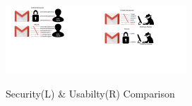 \begin{figure}[htb]
	\begin{center}
		\includegraphics[height=1in,width=0.48\linewidth]{Figures/Introduction/Usability.pdf}\includegraphics[height=1in,width=0.48\linewidth]{Figures/Introduction/Security.pdf}		\caption{Security(L) \& Usabilty(R) Comparison}\label{figure:introduction_security}
	\end{center}
	\vspace{-0.8cm}
\end{figure}


